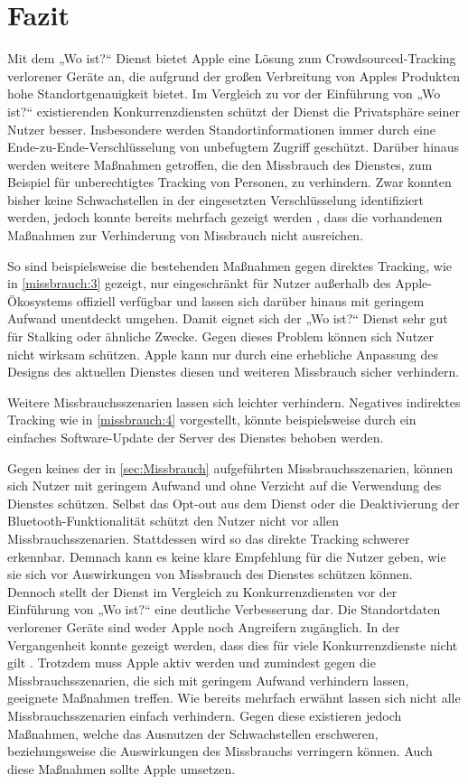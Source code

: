\section{Fazit}
\label{sec:Fazit}

Mit dem „Wo ist?“ Dienst bietet Apple eine Lösung zum Crowdsourced-Tracking verlorener Geräte an, die aufgrund der großen Verbreitung von Apples Produkten hohe Standortgenauigkeit bietet.
Im Vergleich zu vor der Einführung von „Wo ist?“ existierenden Konkurrenzdiensten schützt der Dienst die Privatsphäre seiner Nutzer besser.
Insbesondere werden Standortinformationen immer durch eine Ende-zu-Ende-Verschlüsselung von unbefugtem Zugriff geschützt.
Darüber hinaus werden weitere Maßnahmen getroffen, die den Missbrauch des Dienstes, zum Beispiel für unberechtigtes Tracking von Personen, zu verhindern.
Zwar konnten bisher keine Schwachstellen in der eingesetzten Verschlüsselung identifiziert werden, jedoch konnte bereits mehrfach gezeigt werden \cite{Mayberry_Tracking,braeunlein_sendmy,Tonetto_FindMy}, dass die vorhandenen Maßnahmen zur Verhinderung von Missbrauch nicht ausreichen.

So sind beispielsweise die bestehenden Maßnahmen gegen direktes Tracking, wie in \autoref{missbrauch:3} gezeigt, nur eingeschränkt für Nutzer außerhalb des Apple-Ökosystems offiziell verfügbar und lassen sich darüber hinaus mit geringem Aufwand unentdeckt umgehen.
Damit eignet sich der „Wo ist?“ Dienst sehr gut für Stalking oder ähnliche Zwecke.
Gegen dieses Problem können sich Nutzer nicht wirksam schützen.
Apple kann nur durch eine erhebliche Anpassung des Designs des aktuellen Dienstes diesen und weiteren Missbrauch sicher verhindern.

Weitere Missbrauchsszenarien lassen sich leichter verhindern.
Negatives indirektes Tracking wie in \autoref{missbrauch:4} vorgestellt, könnte beispielsweise durch ein einfaches Software-Update der Server des Dienstes behoben werden.


Gegen keines der in \autoref{sec:Missbrauch} aufgeführten Missbrauchsszenarien, können sich Nutzer mit geringem Aufwand und ohne Verzicht auf die Verwendung des Dienstes schützen.
Selbst das Opt-out aus dem Dienst oder die Deaktivierung der Bluetooth-Funktionalität schützt den Nutzer nicht vor allen Missbrauchsszenarien.
Stattdessen wird so das direkte Tracking schwerer erkennbar.
Demnach kann es keine klare Empfehlung für die Nutzer geben, wie sie sich vor Auswirkungen von Missbrauch des Dienstes schützen können.
Dennoch stellt der Dienst im Vergleich zu Konkurrenzdiensten vor der Einführung von „Wo ist?“ eine deutliche Verbesserung dar.
Die Standortdaten verlorener Geräte sind weder Apple noch Angreifern zugänglich.
In der Vergangenheit konnte gezeigt werden, dass dies für viele Konkurrenzdienste nicht gilt \cite{Garg_Secure_Tracker,Weller_BLE_Finders}.
Trotzdem muss Apple aktiv werden und zumindest gegen die Missbrauchsszenarien, die sich mit geringem Aufwand verhindern lassen, geeignete Maßnahmen treffen.
Wie bereits mehrfach erwähnt lassen sich nicht alle Missbrauchsszenarien einfach verhindern.
Gegen diese existieren jedoch Maßnahmen, welche das Ausnutzen der Schwachstellen erschweren, beziehungsweise die Auswirkungen des Missbrauchs verringern können.
Auch diese Maßnahmen sollte Apple umsetzen.

